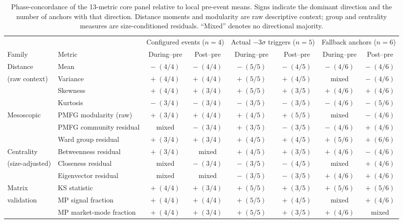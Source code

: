 \begin{table}[width=\textwidth,pos=h]
\centering
\caption{Phase-concordance of the 13-metric core panel relative to local pre-event means. Signs indicate the dominant direction and the number of anchors with that direction. Distance moments and modularity are raw descriptive context; group and centrality measures are size-conditioned residuals. ``Mixed'' denotes no directional majority.}
\label{tab:phase-concordance}
\scriptsize
\setlength{\tabcolsep}{3pt}
\renewcommand{\arraystretch}{1.12}
\begin{tabular*}{\tblwidth}{@{}llcccccc@{}}
\toprule
& & \multicolumn{2}{c}{Configured events ($n=4$)} & \multicolumn{2}{c}{Actual $-3\sigma$ triggers ($n=5$)} & \multicolumn{2}{c}{Fallback anchors ($n=6$)} \\
\cmidrule(lr){3-4}\cmidrule(lr){5-6}\cmidrule(l){7-8}
Family & Metric & During--pre & Post--pre & During--pre & Post--pre & During--pre & Post--pre \\
\midrule
Distance & Mean & $-\;(4/4)$ & $-\;(4/4)$ & $-\;(5/5)$ & $-\;(4/5)$ & $-\;(4/6)$ & $-\;(4/6)$ \\
(raw context) & Variance & $+\;(4/4)$ & $+\;(4/4)$ & $+\;(5/5)$ & $+\;(4/5)$ & mixed & $-\;(4/6)$ \\
& Skewness & $+\;(4/4)$ & $+\;(3/4)$ & $+\;(5/5)$ & $+\;(3/5)$ & $+\;(4/6)$ & $+\;(4/6)$ \\
& Kurtosis & $-\;(3/4)$ & $-\;(3/4)$ & $-\;(3/5)$ & $-\;(3/5)$ & $-\;(4/6)$ & $-\;(5/6)$ \\
\midrule
Mesoscopic & PMFG modularity (raw) & $+\;(3/4)$ & $+\;(4/4)$ & $+\;(4/5)$ & $+\;(5/5)$ & mixed & $-\;(4/6)$ \\
& PMFG community residual & mixed & $-\;(3/4)$ & $+\;(3/5)$ & $-\;(3/5)$ & $-\;(4/6)$ & $+\;(4/6)$ \\
& Ward group residual & $+\;(3/4)$ & $+\;(3/4)$ & $+\;(4/5)$ & $+\;(4/5)$ & $+\;(5/6)$ & $+\;(6/6)$ \\
\midrule
Centrality & Betweenness residual & $+\;(3/4)$ & mixed & $+\;(4/5)$ & $+\;(3/5)$ & $+\;(4/6)$ & $-\;(4/6)$ \\
(size-adjusted) & Closeness residual & mixed & $-\;(3/4)$ & $-\;(3/5)$ & $-\;(4/5)$ & mixed & $+\;(4/6)$ \\
& Eigenvector residual & mixed & mixed & $-\;(3/5)$ & $-\;(3/5)$ & $+\;(4/6)$ & $+\;(4/6)$ \\
\midrule
Matrix & KS statistic & $+\;(4/4)$ & $+\;(3/4)$ & $+\;(5/5)$ & $+\;(3/5)$ & $+\;(5/6)$ & $+\;(5/6)$ \\
validation & MP signal fraction & $+\;(4/4)$ & $+\;(4/4)$ & $+\;(5/5)$ & $+\;(4/5)$ & mixed & $+\;(4/6)$ \\
& MP market-mode fraction & $+\;(4/4)$ & $+\;(3/4)$ & $+\;(5/5)$ & $+\;(3/5)$ & $+\;(4/6)$ & mixed \\
\bottomrule
\end{tabular*}
\end{table}
